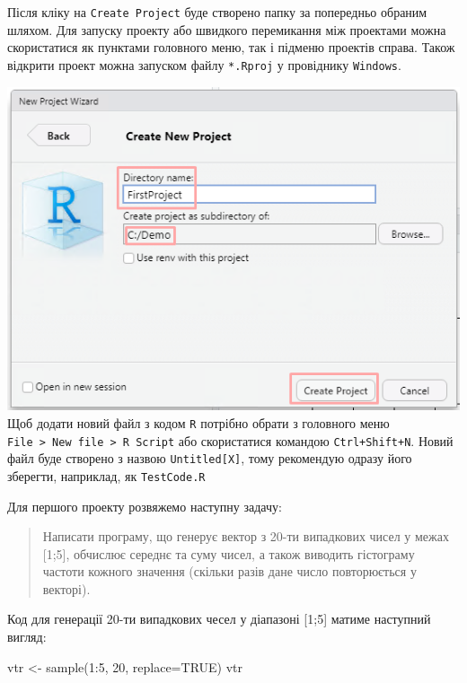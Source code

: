 \documentclass[
]{book}
\newenvironment{Shaded}{\begin{snugshade}}{\end{snugshade}}
\newcommand{\AttributeTok}[1]{\textcolor[rgb]{0.77,0.63,0.00}{#1}}
\newcommand{\ConstantTok}[1]{\textcolor[rgb]{0.00,0.00,0.00}{#1}}
\newcommand{\DecValTok}[1]{\textcolor[rgb]{0.00,0.00,0.81}{#1}}
\newcommand{\FunctionTok}[1]{\textcolor[rgb]{0.00,0.00,0.00}{#1}}
\newcommand{\NormalTok}[1]{#1}
\newcommand{\OtherTok}[1]{\textcolor[rgb]{0.56,0.35,0.01}{#1}}
\newcommand{\SpecialCharTok}[1]{\textcolor[rgb]{0.00,0.00,0.00}{#1}}
\begin{document}
Після кліку на \texttt{Create\ Project} буде створено папку за попередньо обраним шляхом. Для запуску проекту або швидкого перемикання між проектами можна скористатися як пунктами головного меню, так і підменю проектів справа. Також відкрити проект можна запуском файлу \texttt{*.Rproj} у провіднику \texttt{Windows}.

\includegraphics{images/chapter1/rstudio_8.png}
Щоб додати новий файл з кодом \texttt{R} потрібно обрати з головного меню \texttt{File\ \textgreater{}\ New\ file\ \textgreater{}\ R\ Script} або скористатися командою \texttt{Ctrl+Shift+N}. Новий файл буде створено з назвою \texttt{Untitled{[}X{]}}, тому рекомендую одразу його зберегти, наприклад, як \texttt{TestCode.R}

Для першого проекту розвяжемо наступну задачу:

\begin{quote}
Написати програму, що генерує вектор з 20-ти випадкових чисел у межах {[}1;5{]}, обчислює середнє та суму чисел, а також виводить гістограму частоти кожного значення (скільки разів дане число повторюється у векторі).
\end{quote}

Код для генерації 20-ти випадкових чесел у діапазоні {[}1;5{]} матиме наступний вигляд:

\begin{Shaded}
\begin{Highlighting}[]
\NormalTok{vtr }\OtherTok{\textless{}{-}} \FunctionTok{sample}\NormalTok{(}\DecValTok{1}\SpecialCharTok{:}\DecValTok{5}\NormalTok{, }\DecValTok{20}\NormalTok{, }\AttributeTok{replace=}\ConstantTok{TRUE}\NormalTok{)}
\NormalTok{vtr}
\end{Highlighting}
\end{Shaded}
\end{document}
